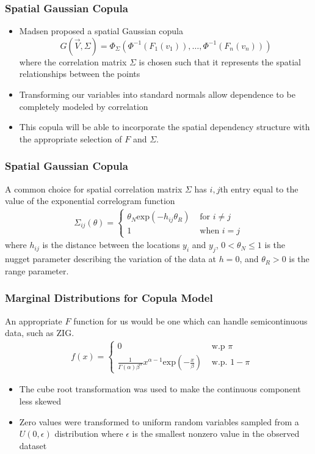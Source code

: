 \documentclass{beamer}
\begin{document}
\begin{frame}
	\frametitle{Spatial Gaussian Copula}
	\begin{itemize}
	\item Madsen\cite{madsen09} proposed a spatial Gaussian copula
	$$
	G(\vec{V}, \Sigma) = \Phi_{\Sigma}(\Phi^{-1}(F_1(v_1)), \ldots, \Phi^{-1}(F_n(v_n)))
	$$
	where the correlation matrix $\Sigma$ is chosen such that it represents the spatial relationships between the points
	\item Transforming our variables into standard normals allow dependence to be completely modeled by correlation
	\item This copula will be able to incorporate the spatial dependency structure with the appropriate selection of $F$ and $\Sigma$.
	\end{itemize}
\end{frame}

\begin{frame}
	\frametitle{Spatial Gaussian Copula}
	A common choice for spatial correlation matrix $\Sigma$ has $i,j$th entry equal to the value of the exponential correlogram function
	\begin{align*}
	\Sigma_{ij}(\theta) = 
		\begin{cases}
			\theta_N \text{exp}(-h_{ij} \theta_R) & \text{ for } i \neq j\\
			1 & \text{ when } i = j
		\end{cases}
	\end{align*}
where $h_{ij}$ is the distance between the locations $y_i$ and $y_j$, $0 < \theta_N \leq 1$ is the nugget parameter describing the variation of the data at $h = 0$, and $\theta_R > 0$ is the range parameter.
\end{frame}

\begin{frame}
	\frametitle{Marginal Distributions for Copula Model}
	An appropriate $F$ function for us would be one which can handle semicontinuous data, such as ZIG.
	\begin{align*}
	&f(x) = 
	\begin{cases}
		0 & \text{ w.p } \pi \\
		\frac{1}{\Gamma(\alpha) \beta^\alpha} x^{\alpha -1} \text{exp}\left(-\frac{x}{\beta}\right) & \text{ w.p. } 1 - \pi
	\end{cases} 
	\end{align*}
	\begin{itemize}
	\item The cube root transformation was used to make the continuous component less skewed
	\item Zero values were transformed to uniform random variables sampled from a $U(0, \epsilon)$ distribution where $\epsilon$ is the smallest nonzero value in the observed dataset
	\end{itemize}
\end{frame}
\end{document}
